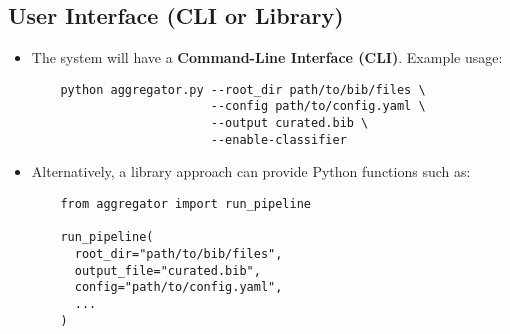 \documentclass[12pt]{article}
\begin{document}
\subsection{User Interface (CLI or Library)}
\begin{itemize}
  \item The system will have a \textbf{Command-Line Interface (CLI)}. Example usage:
  \begin{verbatim}
    python aggregator.py --root_dir path/to/bib/files \
                         --config path/to/config.yaml \
                         --output curated.bib \
                         --enable-classifier
  \end{verbatim}
  \item Alternatively, a library approach can provide Python functions such as:
  \begin{verbatim}
    from aggregator import run_pipeline

    run_pipeline(
      root_dir="path/to/bib/files",
      output_file="curated.bib",
      config="path/to/config.yaml",
      ...
    )
  \end{verbatim}
\end{itemize}
\end{document}
